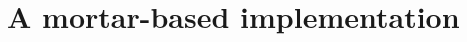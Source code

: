\documentclass[review]{siamart0216}
\theoremstyle{assumption}
\renewcommand{\hat}[1]{\hat{#1}}
\newcommand{\pd}[2]{\frac{\partial#1}{\partial#2}}
\newcommand{\LRp}[1]{\left( #1 \right)}
\newcommand{\LRl}[1]{\left. #1 \right|}
\newcommand{\Grad} {\ensuremath{\nabla}}
\renewcommand{\hat}{\widehat}
\newcommand{\note}[1]{{\color{blue}{#1}}}
\begin{document}
 \note{finish}

%
%
%
%

\section{A mortar-based implementation}
\end{document}
